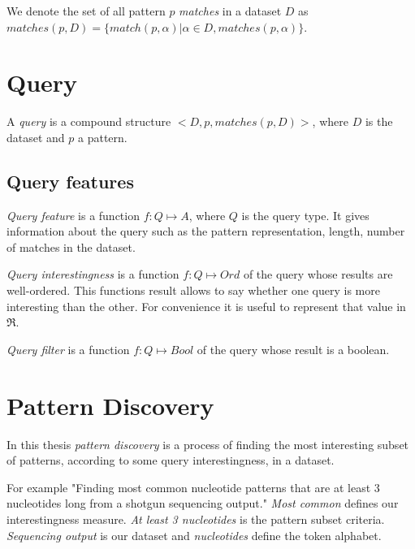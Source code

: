 We denote the set of all pattern $p$ \emph{matches} in a dataset 
$D$ as $matches(p, D) = \{ match(p, \alpha) | \alpha \in D, matches(p, \alpha) \}$.

\section{Query}

A \emph{query} is a compound structure $<D, p, matches(p, D)>$, 
where $D$ is the dataset and $p$ a pattern.

\subsection{Query features}

\emph{Query feature} is a function $f: Q \mapsto A$, 
where $Q$ is the query type. It gives information about 
the query such as the pattern representation, 
length, number of matches in the dataset.

\emph{Query interestingness} is a function $f: Q \mapsto Ord$ 
of the query whose results are well-ordered. This functions result allows to
say whether one query is more interesting than the other.
For convenience it is useful to represent that value in
$\Re$.

\emph{Query filter} is a function $f: Q \mapsto Bool$ of the query whose result
is a boolean.

\section{Pattern Discovery}

In this thesis \emph{pattern discovery} is a process of finding 
the most interesting subset of patterns, according to some query interestingness,
in a dataset.

For example "Finding most common nucleotide patterns that are at least 3 nucleotides long 
from a shotgun sequencing output." \emph{Most common} defines our interestingness 
measure. \emph{At least 3 nucleotides} is the pattern subset criteria. 
\emph{Sequencing output} is our dataset and \emph{nucleotides} define the token alphabet.